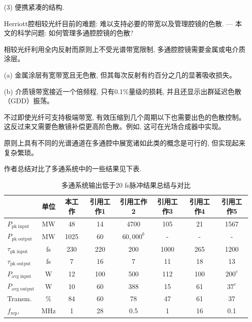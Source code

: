 \documentclass[14pt,a4paper,oneside]{article}
\numberwithin{equation}{subsection}             %
\numberwithin{figure}{subsection}               %
\begin{document}
(3) 便携紧凑的结构.

Herriott腔相较光纤目前的难题: 难以支持必要的带宽以及管理腔镜的色散. --- 本文的科学问题: 如何管理多通腔腔镜的色散?

相较光纤利用全内反射而原则上不受光谱带宽限制, 多通腔腔镜需要金属或电介质涂层。

(a) 金属涂层有宽带宽且无色散, 但其每次反射有约百分之几的显著吸收损失。

(b) 介质镜带宽接近一个倍频程, 只有0.1\%量级的损耗, 并且还显示出群延迟色散（GDD）振荡。

不过即使光纤可支持极端带宽, 有效压缩到几个周期以下也需要出色的色散控制。这反过来又需要色散镜补偿更高阶色散。例如, 这可在光场合成器中实现\cite{wirthSynthesizedLightTransients2011}。

原则上具有不同的光谱通道在多通腔中展宽诸如此类的概念是可行的, 但实现起来复杂繁琐。

作者总结对比了多通系统中的一些结果见下表.

\begin{table}[!ht]
    \renewcommand{\arraystretch}{3}
	\centering\fontsize{9pt}{3}\selectfont
    \caption{多通系统输出低于20 fs脉冲结果总结与对比}
    \begin{tabular}{lccccccc}
    \hline
    & 单位 & 本工作 & 引用工作1\cite{fritschAllsolidstateMultipassSpectral2018} & 引用工作2\cite{mullerMultipassCellHighpower2021} & 引用工作3\cite{goncharovFewcyclePulseCompression2023a} & 引用工作4 & 引用工作5\cite{ballaPostcompressionPicosecondPulses2020a}\\
    \hline
    $P_{\mathrm{pk\;input}}$ & MW & 48 & 14 & 4700 & 105 & 21 & 1567\\
    $P_{\mathrm{pk\;output}}$ & MW & 1025 & 60 & $60,000^b$ & - & - & -\\
    $\tau_{\mathrm{pk\;input}}$ & fs & 230 & 220 & 200 & 1000 & 265 & 1200\\
    $\tau_{\mathrm{pk\;output}}$ & fs & 7 & 16 & 7 & 11 & 18 & 13\\
    $P_{\mathrm{avg\;input}}$ & W & 12 & 100 & 500 & 112 & 100 & $200^c$\\
    $P_{\mathrm{avg\;output}}$ & W & 10 & 60 & 388 & 15 & 61 & $37^c$\\
    Transm. & \% & 84 & 60 & 78 & 47 & 61 & 37 \\
    $f_{\mathrm{rep}},$ & MHz & 1 & 28 & 0.5 & 1 & 16 & 0.1 \\
    \hline
    \end{tabular}
\end{table}
\end{document}

